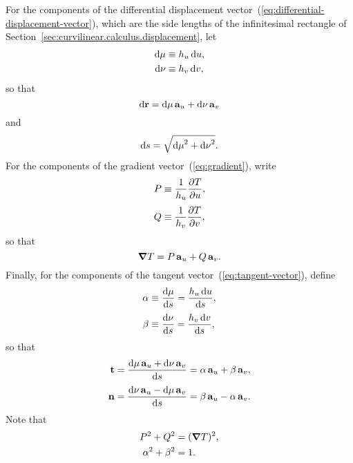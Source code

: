 For the components of the differential displacement
vector~(\ref{eq:differential-displacement-vector}),
which are the side lengths of the infinitesimal rectangle
of Section~\ref{sec:curvilinear.calculus.displacement},
let
\begin{align}
  \mathop{}\!\mathrm{d} \mu &\equiv h_{u} \mathop{}\!\mathrm{d} u,
    \label{eq:differential-displacement-u-component} \\
  \mathop{}\!\mathrm{d} \nu &\equiv h_{v} \mathop{}\!\mathrm{d} v,
    \label{eq:differential-displacement-v-component}
\end{align}
so that
\begin{equation}
  \mathop{}\!\mathrm{d} \boldsymbol{\mathrm{r}} = \mathop{}\!\mathrm{d} \mu \mathop{}\!\boldsymbol{\mathrm{a}}_{u} + \mathop{}\!\mathrm{d} \nu \mathop{}\!\boldsymbol{\mathrm{a}}_{v}
  \label{eq:differential-displacement-vector-abbreviated}
\end{equation}
and
\begin{equation}
  \mathop{}\!\mathrm{d} s = \sqrt{{\mathop{}\!\mathrm{d} \mu}^2 + {\mathop{}\!\mathrm{d} \nu}^2}.
  \label{eq:differential-arc-length-abbreviated}
\end{equation}
For the components of the gradient vector~(\ref{eq:gradient}),
write
\begin{align}
  P &\defeq \frac{1}{\scalefac{u}} \pder{T}{u},
    \label{eq:gradient-u-component} \\[\fraclinespace]
  Q &\defeq \frac{1}{\scalefac{v}} \pder{T}{v},
    \label{eq:gradient-v-component}
\end{align}
so that
\begin{equation}
  \mathop{}\!\boldsymbol{\mathrm{\nabla}} T = P \mathop{}\!\boldsymbol{\mathrm{a}}_{u} + Q \mathop{}\!\boldsymbol{\mathrm{a}}_{v}.
  \label{eq:gradient-abbreviated}
\end{equation}
Finally, for the components of
the tangent vector~(\ref{eq:tangent-vector}), define
\begin{align}
  \alpha &\defeq \tder{\mu}{s} = \frac{\scalefac{u} \td u}{\td s},
    \label{eq:tangent-u-component} \\[\fraclinespace]
  \beta &\defeq \tder{\nu}{s} = \frac{\scalefac{v} \td v}{\td s},
    \label{eq:tangent-v-component}
\end{align}
so that
\begin{align}
  \tangentvec
  &= \frac{\td \mu \basisvec{u} + \td \nu \basisvec{v}}{\td s}
  = \alpha \basisvec{u} + \beta \basisvec{v},
    \label{eq:tangent-vector-abbreviated} \\[\fraclinespace]
  \normalvec
  &= \frac{\td \nu \basisvec{u} - \td \mu \basisvec{v}}{\td s}
  = \beta \basisvec{u} - \alpha \basisvec{v}.
    \label{eq:normal-vector-abbreviated}
\end{align}
Note that
\begin{align}
  P^2 + Q^2 &= (\mathop{}\!\boldsymbol{\mathrm{\nabla}} T)^2, \label{eq:gradient-pythagoras} \\
  \alpha^2 + \beta^2 &= 1. \label{eq:tangent-pythagoras}
\end{align}

